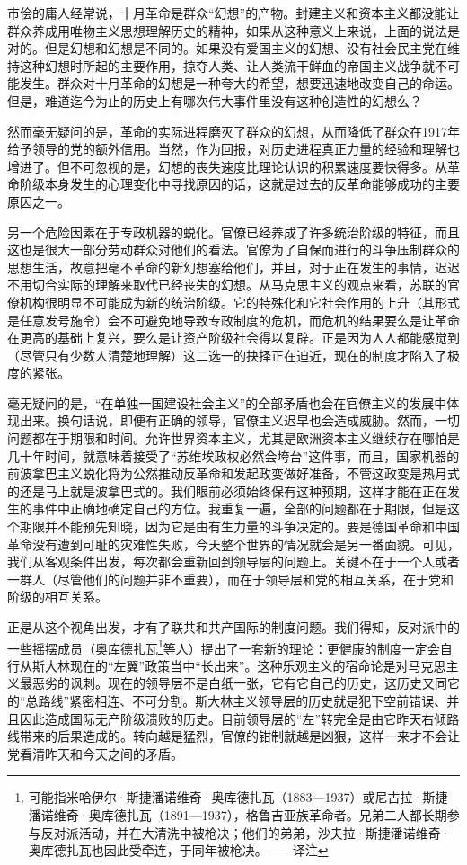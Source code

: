 \documentclass[UTF8, 12pt, a4paper]{ctexrep}
\begin{document}
市侩的庸人经常说，十月革命是群众“幻想”的产物。封建主义和资本主义都没能让群众养成用唯物主义思想理解历史的精神，如果从这种意义上来说，上面的说法是对的。但是幻想和幻想是不同的。如果没有爱国主义的幻想、没有社会民主党在维持这种幻想时所起的主要作用，掠夺人类、让人类流干鲜血的帝国主义战争就不可能发生。群众对十月革命的幻想是一种夸大的希望，想要迅速地改变自己的命运。但是，难道迄今为止的历史上有哪次伟大事件里没有这种创造性的幻想么？

然而毫无疑问的是，革命的实际进程磨灭了群众的幻想，从而降低了群众在1917年给予领导的党的额外信用。当然，作为回报，对历史进程真正力量的经验和理解也增进了。但不可忽视的是，幻想的丧失速度比理论认识的积累速度要快得多。从革命阶级本身发生的心理变化中寻找原因的话，这就是过去的反革命能够成功的主要原因之一。

另一个危险因素在于专政机器的蜕化。官僚已经养成了许多统治阶级的特征，而且这也是很大一部分劳动群众对他们的看法。官僚为了自保而进行的斗争压制群众的思想生活，故意把毫不革命的新幻想塞给他们，并且，对于正在发生的事情，迟迟不用切合实际的理解来取代已经丧失的幻想。从马克思主义的观点来看，苏联的官僚机构很明显不可能成为新的统治阶级。它的特殊化和它社会作用的上升（其形式是任意发号施令）会不可避免地导致专政制度的危机，而危机的结果要么是让革命在更高的基础上复兴，要么是让资产阶级社会得以复辟。正是因为人人都能感觉到（尽管只有少数人清楚地理解）这二选一的抉择正在迫近，现在的制度才陷入了极度的紧张。

毫无疑问的是，“在单独一国建设社会主义”的全部矛盾也会在官僚主义的发展中体现出来。换句话说，即便有正确的领导，官僚主义迟早也会造成威胁。然而，一切问题都在于期限和时间。允许世界资本主义，尤其是欧洲资本主义继续存在哪怕是几十年时间，就意味着接受了“苏维埃政权必然会垮台”这件事，而且，国家机器的前波拿巴主义蜕化将为公然推动反革命和发起政变做好准备，不管这政变是热月式的还是马上就是波拿巴式的。我们眼前必须始终保有这种预期，这样才能在正在发生的事件中正确地确定自己的方位。我重复一遍，全部的问题都在于期限，但是这个期限并不能预先知晓，因为它是由有生力量的斗争决定的。要是德国革命和中国革命没有遭到可耻的灾难性失败，今天整个世界的情况就会是另一番面貌。可见，我们从客观条件出发，每次都会重新回到领导层的问题上。关键不在于一个人或者一群人（尽管他们的问题并非不重要），而在于领导层和党的相互关系，在于党和阶级的相互关系。

正是从这个视角出发，才有了联共和共产国际的制度问题。我们得知，反对派中的一些摇摆成员（奥库德扎瓦\footnote{可能指米哈伊尔·斯捷潘诺维奇·奥库德扎瓦（1883—1937）或尼古拉·斯捷潘诺维奇·奥库德扎瓦（1891—1937），格鲁吉亚族革命者。兄弟二人都长期参与反对派活动，并在大清洗中被枪决；他们的弟弟，沙夫拉·斯捷潘诺维奇·奥库德扎瓦也因此受牵连，于同年被枪决。——译注}等人）提出了一套新的理论：更健康的制度一定会自行从斯大林现在的“左翼”政策当中“长出来”。这种乐观主义的宿命论是对马克思主义最恶劣的讽刺。现在的领导层不是白纸一张，它有它自己的历史，这历史又同它的“总路线”紧密相连、不可分割。斯大林主义领导层的历史就是犯下空前错误、并且因此造成国际无产阶级溃败的历史。目前领导层的“左”转完全是由它昨天右倾路线带来的后果造成的。转向越是猛烈，官僚的钳制就越是凶狠，这样一来才不会让党看清昨天和今天之间的矛盾。
\end{document}

